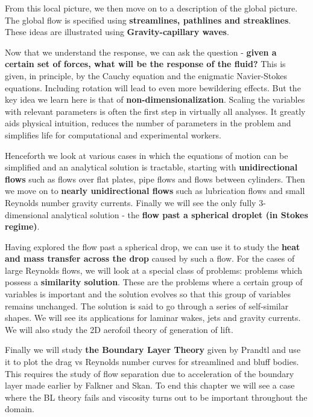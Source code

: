 \documentclass[11pt,a4paper]{article}
\begin{document}
 From this local picture, we then move on to a description of the global picture. The global flow is specified using \textbf{streamlines, pathlines and streaklines}. These ideas are illustrated using \textbf{Gravity-capillary waves}.

\hfill

Now that we understand the response, we can ask the question - \textbf{given a certain set of forces, what will be the response of the fluid?} This is given, in principle, by the Cauchy equation and the enigmatic Navier-Stokes equations. Including rotation will lead to even more bewildering effects. But the key idea we learn here is that of \textbf{non-dimensionalization}. Scaling the variables with relevant parameters is often the first step in virtually all analyses. It greatly aids physical intuition, reduces the number of parameters in the problem and simplifies life for computational and experimental workers. 

\hfill

Henceforth we look at various cases in which the equations of motion can be simplified and an analytical solution is tractable, starting with \textbf{unidirectional flows} such as flows over flat plates, pipe flows and flows between cylinders. Then we move on to \textbf{nearly unidirectional flows} such as lubrication flows and small Reynolds number gravity currents. Finally we will see the only fully 3-dimensional analytical solution - the \textbf{flow past a spherical droplet (in Stokes regime)}.

\hfill

Having explored the flow past a spherical drop, we can use it to study the \textbf{heat and mass transfer across the drop} caused by such a flow. For the cases of large Reynolds flows, we will look at a special class of problems: problems which possess a \textbf{similarity solution}. These are the problems where a certain group of variables is important and the solution evolves so that this group of variables remains unchanged. The solution is said to go through a series of self-similar shapes. We will see its applications for laminar wakes, jets and gravity currents. We will also study the 2D aerofoil theory of generation of lift.

\hfill

Finally we will study \textbf{the Boundary Layer Theory} given by Prandtl and use it to plot the drag vs Reynolds number curves for streamlined and bluff bodies. This requires the study of flow separation due to acceleration of the boundary layer made earlier by Falkner and Skan. To end this chapter we will see a case where the BL theory fails and viscosity turns out to be important throughout the domain. 
\end{document}
